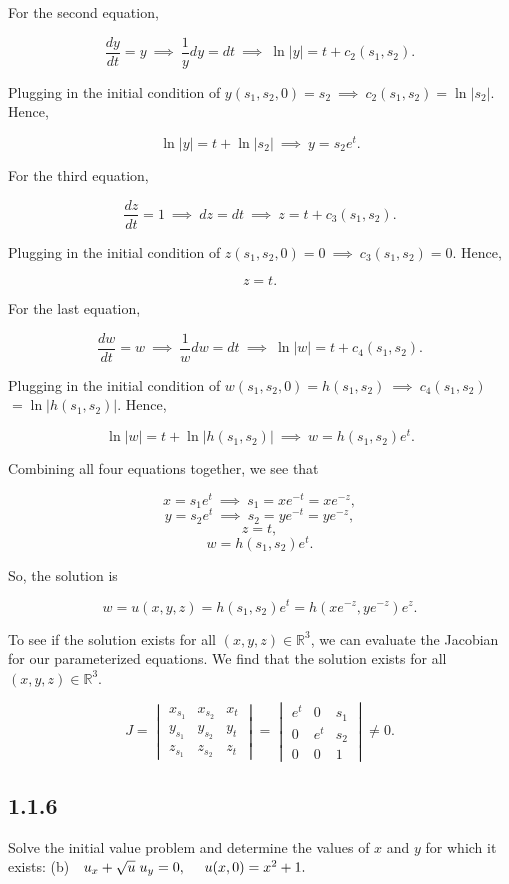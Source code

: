 \documentclass{article}
\begin{document}
\begin{flushleft}
For the second equation,

$$\frac{dy}{dt}=y ~\implies~ \frac{1}{y}dy = dt ~\implies~ \ln{|y|}=t+c_2(s_1,s_2).$$

Plugging in the initial condition of $ y(s_1,s_2,0)=s_2 ~\implies~  c_2(s_1,s_2)=\ln{|s_2|}$. Hence,

$$\ln{|y|}=t+\ln{|s_2|} ~\implies~  y=s_2e^t.$$

For the third equation,

$$\frac{dz}{dt}=1 ~\implies~ dz = dt ~\implies~ z=t+c_3(s_1,s_2).$$

Plugging in the initial condition of $ z(s_1,s_2,0)=0 ~\implies~  c_3(s_1,s_2)=0$. Hence,

$$z=t.$$

For the last equation,

$$\frac{dw}{dt}=w ~\implies~ \frac{1}{w}dw = dt ~\implies~ \ln{|w|}=t+c_4(s_1,s_2).$$

Plugging in the initial condition of $ w(s_1,s_2,0)=h(s_1,s_2) ~\implies~  c_4(s_1,s_2)$ $=\ln{|h(s_1,s_2)|}$. Hence,

$$\ln{|w|}=t+\ln{|h(s_1,s_2)|} ~\implies~  w=h(s_1,s_2)e^t.$$

Combining all four equations together, we see that

$$x=s_1e^t ~\implies~ s_1 = xe^{-t}=xe^{-z},$$
$$y=s_2e^t ~\implies~ s_2 = ye^{-t}=ye^{-z},$$
$$z=t,$$
$$w=h(s_1,s_2)e^t.$$

So, the solution is

$$w=u(x,y,z)=h(s_1,s_2)e^t=h(xe^{-z},ye^{-z})e^z.$$

To see if the solution exists for all $(x,y,z)\in\mathbb R^3$, we can evaluate the Jacobian for our parameterized equations. We find that the solution exists for all $(x,y,z)\in\mathbb R^3$.

$$J=\begin{vmatrix}
x_{s_1} & x_{s_2} & x_t \\
y_{s_1} & y_{s_2} & y_t \\
z_{s_1} & z_{s_2} & z_t
\end{vmatrix}=\begin{vmatrix}
e^t & 0 & s_1 \\
0 & e^t & s_2 \\
0 & 0 & 1
\end{vmatrix} \neq 0.$$


\subsection{\textbf{1.1.6}} Solve the initial value problem and determine the values of $x$ and $y$ for which it exists:
\newline (b)~~$u_x+\sqrt{u}\hspace{1mm}u_y=0,~~~~ u(x,0)=x^2+1.$


\end{flushleft}
\end{document}
